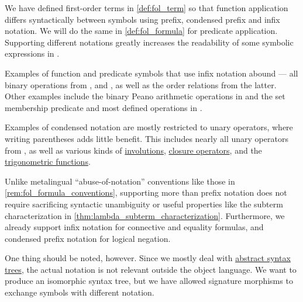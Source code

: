 \begin{remark}\label{rem:fol_application_notation}
  We have defined first-order terms in \cref{def:fol_term} so that function application differs syntactically between symbols using prefix, condensed prefix and infix notation. We will do the same in \cref{def:fol_formula} for predicate application. Supporting different notations greatly increases the readability of some symbolic expressions in \cite{notebook:code}.

  Examples of function and predicate symbols that use infix notation abound --- all binary operations from ,  and , as well as the order relations from the latter. Other examples include the binary Peano arithmetic operations in  and the set membership predicate and most defined operations in .

  Examples of condensed notation are mostly restricted to unary operators, where writing parentheses adds little benefit. This includes nearly all unary operators from , as well as various kinds of \hyperref[def:categorical_involution]{involutions}, \hyperref[def:abstract_closure_operator]{closure operators}, and the \hyperref[sec:trigonometric_functions]{trigonometric functions}.

  Unlike metalingual \enquote{abuse-of-notation} conventions like those in \cref{rem:fol_formula_conventions}, supporting more than prefix notation does not require sacrificing syntactic unambiguity or useful properties like the subterm characterization in \cref{thm:lambda_subterm_characterization}. Furthermore, we already support infix notation for connective and equality formulas, and condensed prefix notation for logical negation.

  One thing should be noted, however. Since we mostly deal with \hyperref[con:abstract_syntax_tree]{abstract syntax trees}, the actual notation is not relevant outside the object language. We want  to produce an isomorphic syntax tree, but we have allowed signature morphisms to exchange symbols with different notation.


\end{remark}
